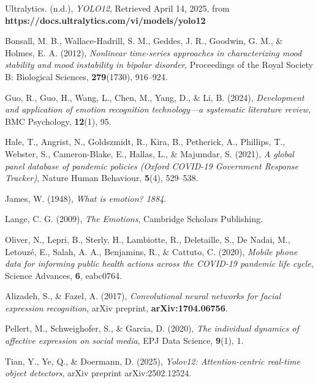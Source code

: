 \documentclass[a4paper,13pt]{report}
\begin{document}
\clearpage
\renewcommand{\bibname}{REFERENCE LIST}
\begin{thebibliography}{9}

Ultralytics. (n.d.), \textit{YOLO12}, Retrieved April 14, 2025, from \textbf{https://docs.ultralytics.com/vi/models/yolo12}

Bonsall, M. B., Wallace-Hadrill, S. M., Geddes, J. R., Goodwin, G. M., \& Holmes, E. A. (2012), \textit{Nonlinear time-series approaches in characterizing mood stability and mood instability in bipolar disorder}, Proceedings of the Royal Society B: Biological Sciences, \textbf{279}(1730), 916–924.

Guo, R., Guo, H., Wang, L., Chen, M., Yang, D., \& Li, B. (2024), \textit{Development and application of emotion recognition technology—a systematic literature review}, BMC Psychology, \textbf{12}(1), 95. 

Hale, T., Angrist, N., Goldszmidt, R., Kira, B., Petherick, A., Phillips, T., Webster, S., Cameron-Blake, E., Hallas, L., \& Majumdar, S. (2021), \textit{A global panel database of pandemic policies (Oxford COVID-19 Government Response Tracker)}, Nature Human Behaviour, \textbf{5}(4), 529–538.

James, W. (1948), \textit{What is emotion? 1884}.

Lange, C. G. (2009), \textit{The Emotions}, Cambridge Scholars Publishing.

Oliver, N., Lepri, B., Sterly, H., Lambiotte, R., Deletaille, S., De Nadai, M., Letouzé, E., Salah, A. A., Benjamins, R., \& Cattuto, C. (2020), \textit{Mobile phone data for informing public health actions across the COVID-19 pandemic life cycle}, Science Advances, \textbf{6}, eabc0764.

 Alizadeh, S., \& Fazel, A. (2017), \textit{Convolutional neural networks for facial expression recognition}, arXiv preprint, \textbf{arXiv:1704.06756}.

Pellert, M., Schweighofer, S., \& Garcia, D. (2020), \textit{The individual dynamics of affective expression on social media}, EPJ Data Science, \textbf{9}(1), 1.

Tian, Y., Ye, Q., \& Doermann, D. (2025), \textit{Yolov12: Attention-centric real-time object detectors}, arXiv preprint arXiv:2502.12524. 


\end{thebibliography}
\end{document}
